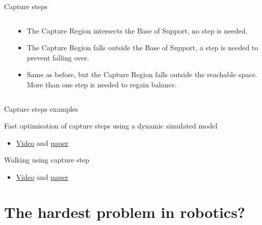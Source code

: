 \documentclass[compress]{beamer}
\begin{document}
\begin{frame}{Capture steps}
{\begin{columns}
\begin{column}{0.5\linewidth}
\begin{center}
            \end{center}
        \end{column}
        \begin{column}{0.5\linewidth}
    \begin{itemize}

        \item The Capture Region intersects the Base of Support, no step is needed.
        \item The Capture Region falls outside the Base of Support, a step is needed
            to prevent falling over.
        \item Same as before, but the Capture Region falls outside the reachable
            space. More than one step is needed to regain balance.
    \end{itemize}
        \end{column}
    \end{columns}
    }

\end{frame}

\begin{frame}{Capture steps examples}

    Fast optimisation of capture steps using a dynamic simulated model

    \begin{itemize}

        \item \href{http://spectrum.ieee.org/automaton/robotics/humanoids/japanese-high-power-humanoid-robot-hrp3l-jsk}{Video}
            and
            \href{http://ieeexplore.ieee.org/xpl/login.jsp?tp=\&arnumber=6100894\&url=http://ieeexplore.ieee.org/xpls/icp.jsp?arnumber\%3D6100894}{paper}
    \end{itemize}

    Walking using capture step

    \begin{itemize}

        \item \href{http://www.ais.uni-bonn.de/movies/WalkingWithCaptureSteps.wmv}{Video}
            and
            \href{http://www.ais.uni-bonn.de/papers/RoboCup_2014_Missura_Capture_Steps.pdf}{paper}
    \end{itemize}

\end{frame}

\section{The hardest problem in robotics?}
\end{document}
